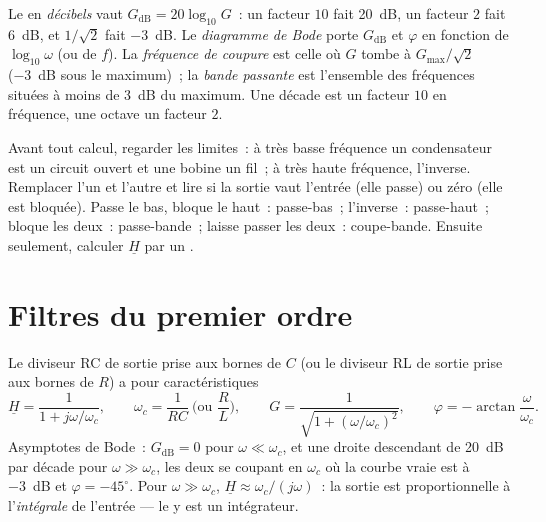 \begin{definition}\label{def:b1:filters-transfer-functions:bode}
Le  en \emph{décibels} vaut $G_{\mathrm{dB}} = 20\log_{10}G$~: un
facteur $10$ fait \qty{20}{dB}, un facteur $2$ fait \qty{6}{dB}, et
$1/\sqrt2$ fait \qty{-3}{dB}. Le \emph{diagramme de Bode} porte
$G_{\mathrm{dB}}$ et $\varphi$ en fonction de $\log_{10}\omega$ (ou de
$f$). La \emph{fréquence de coupure} est celle où $G$ tombe à
$G_{\max}/\sqrt2$ (\qty{-3}{dB} sous le maximum)~; la \emph{bande
passante} est l'ensemble des fréquences situées à moins de \qty{3}{dB}
du maximum. Une décade est un facteur $10$ en fréquence, une octave un
facteur $2$.
\end{definition}

\begin{method}\label{met:b1:filters-transfer-functions:nature}
Avant tout calcul, regarder les limites~: à très basse fréquence un
condensateur est un circuit ouvert et une bobine un fil~; à très haute
fréquence, l'inverse. Remplacer l'un et l'autre et lire si la sortie
vaut l'entrée (elle passe) ou zéro (elle est bloquée). Passe le bas,
bloque le haut~: passe-bas~; l'inverse~: passe-haut~; bloque les deux~:
passe-bande~; laisse passer les deux~: coupe-bande. Ensuite seulement,
calculer $\underline H$ par un .
\end{method}

\section{Filtres du premier ordre}

\begin{proposition}\label{prop:b1:filters-transfer-functions:lowpass1}
Le diviseur RC de sortie prise aux bornes de $C$ (ou le diviseur RL de
sortie prise aux bornes de $R$) a pour caractéristiques
\[
\underline H = \frac{1}{1 + j\omega/\omega_c}, \qquad
\omega_c = \frac{1}{RC} \ \Big(\text{ou } \frac{R}{L}\Big),
\qquad G = \frac{1}{\sqrt{1 + (\omega/\omega_c)^2}}, \qquad
\varphi = -\arctan\frac{\omega}{\omega_c} .
\]
Asymptotes de Bode~: $G_{\mathrm{dB}} = 0$ pour $\omega \ll \omega_c$, et
une droite descendant de \qty{20}{dB} par décade pour
$\omega \gg \omega_c$, les deux se coupant en $\omega_c$ où la courbe
vraie est à \qty{-3}{dB} et $\varphi = -45^\circ$. Pour
$\omega \gg \omega_c$, $\underline H \approx
\omega_c/(j\omega)$~: la sortie est proportionnelle à l'\emph{intégrale}
de l'entrée --- le  y est un intégrateur.
\end{proposition}

